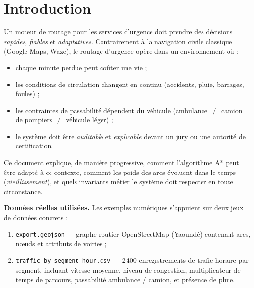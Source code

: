 \documentclass[12pt,a4paper]{article}
\theoremstyle{definition}
\theoremstyle{remark}
\begin{document}
\tableofcontents
\newpage

\section*{Introduction}

Un moteur de routage pour les services d'urgence doit prendre des décisions
\emph{rapides}, \emph{fiables} et \emph{adaptatives}. Contrairement à la
navigation civile classique (Google Maps, Waze), le routage d'urgence opère
dans un environnement où :

\begin{itemize}
  \item chaque minute perdue peut coûter une vie ;
  \item les conditions de circulation changent en continu (accidents, pluie,
        barrages, foules) ;
  \item les contraintes de passabilité dépendent du véhicule (ambulance
        $\neq$ camion de pompiers $\neq$ véhicule léger) ;
  \item le système doit être \emph{auditabl}e et \emph{explicable} devant
        un jury ou une autorité de certification.
\end{itemize}

Ce document explique, de manière progressive, comment l'algorithme A*
peut être adapté à ce contexte, comment les poids des arcs évoluent dans le
temps (\emph{vieillissement}), et quels invariants métier le système doit
respecter en toute circonstance.

\bigskip
\noindent\textbf{Données réelles utilisées.}
Les exemples numériques s'appuient sur deux jeux de données concrets :
\begin{enumerate}
  \item \texttt{export.geojson} — graphe routier OpenStreetMap (Yaoundé)
        contenant arcs, nœuds et attributs de voiries ;
  \item \texttt{traffic\_by\_segment\_hour.csv} — 2\,400 enregistrements
        de trafic horaire par segment, incluant vitesse moyenne, niveau de
        congestion, multiplicateur de temps de parcours, passabilité ambulance
        / camion, et présence de pluie.
\end{enumerate}
\end{document}
